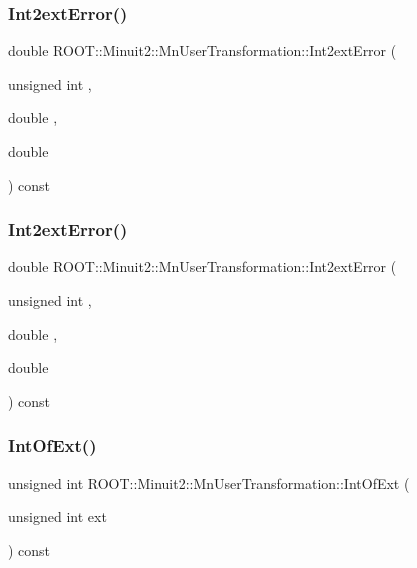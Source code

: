 \subsubsection{\texorpdfstring{Int2extError()}{Int2extError()}\hspace{0.1cm}{\footnotesize\ttfamily [2/3]}}
{\footnotesize\ttfamily double R\+O\+O\+T\+::\+Minuit2\+::\+Mn\+User\+Transformation\+::\+Int2ext\+Error (\begin{DoxyParamCaption}\item[{unsigned int}]{,  }\item[{double}]{,  }\item[{double}]{ }\end{DoxyParamCaption}) const}

\mbox{\label{classROOT_1_1Minuit2_1_1MnUserTransformation_ad900f367f4d2c5df13f899dd55bdf212}} 
\subsubsection{\texorpdfstring{Int2extError()}{Int2extError()}\hspace{0.1cm}{\footnotesize\ttfamily [3/3]}}
{\footnotesize\ttfamily double R\+O\+O\+T\+::\+Minuit2\+::\+Mn\+User\+Transformation\+::\+Int2ext\+Error (\begin{DoxyParamCaption}\item[{unsigned int}]{,  }\item[{double}]{,  }\item[{double}]{ }\end{DoxyParamCaption}) const}

\mbox{\label{classROOT_1_1Minuit2_1_1MnUserTransformation_a69f58a6d486e2a57789cd8a8445cf23d}} 
\subsubsection{\texorpdfstring{IntOfExt()}{IntOfExt()}\hspace{0.1cm}{\footnotesize\ttfamily [1/3]}}
{\footnotesize\ttfamily unsigned int R\+O\+O\+T\+::\+Minuit2\+::\+Mn\+User\+Transformation\+::\+Int\+Of\+Ext (\begin{DoxyParamCaption}\item[{unsigned int}]{ext }\end{DoxyParamCaption}) const}

